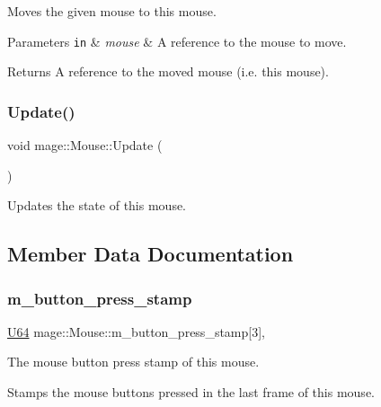Moves the given mouse to this mouse.


\begin{DoxyParams}[1]{Parameters}
\mbox{\tt in}  & {\em mouse} & A reference to the mouse to move. \\
\hline
\end{DoxyParams}
\begin{DoxyReturn}{Returns}
A reference to the moved mouse (i.\+e. this mouse). 
\end{DoxyReturn}
\hypertarget{classmage_1_1_mouse_a0cddae3f871dd69c1ba6928dc6b1f985}{}\label{classmage_1_1_mouse_a0cddae3f871dd69c1ba6928dc6b1f985} 
\subsubsection{\texorpdfstring{Update()}{Update()}}
{\footnotesize\ttfamily void mage\+::\+Mouse\+::\+Update (\begin{DoxyParamCaption}{ }\end{DoxyParamCaption})}

Updates the state of this mouse. 

\subsection{Member Data Documentation}
\hypertarget{classmage_1_1_mouse_aed4e1d8b806bec657f3d29a35c93ebf4}{}\label{classmage_1_1_mouse_aed4e1d8b806bec657f3d29a35c93ebf4} 
\subsubsection{\texorpdfstring{m\+\_\+button\+\_\+press\+\_\+stamp}{m\_button\_press\_stamp}}
{\footnotesize\ttfamily \hyperlink{namespacemage_a6672cf3c861707ce4a3235a3eb43941d}{U64} mage\+::\+Mouse\+::m\+\_\+button\+\_\+press\+\_\+stamp\mbox{[}3\mbox{]}\hspace{0.3cm}{\ttfamily [mutable]}, {\ttfamily [private]}}

The mouse button press stamp of this mouse.

Stamps the mouse buttons pressed in the last frame of this mouse. \hypertarget{classmage_1_1_mouse_a80591f7f27f026942f461c8af2ebbd1e}{}\label{classmage_1_1_mouse_a80591f7f27f026942f461c8af2ebbd1e} 
